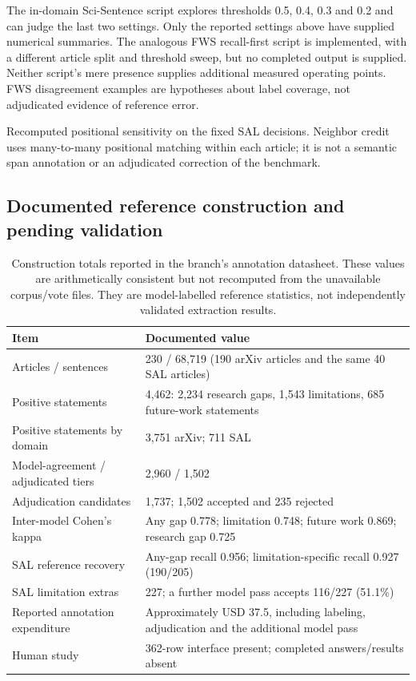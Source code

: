 The in-domain Sci-Sentence script explores thresholds 0.5, 0.4, 0.3 and 0.2 and can judge the
last two settings. Only the reported settings above have supplied numerical summaries.
The analogous FWS recall-first script is implemented, with a different article split and
threshold sweep, but no completed output is supplied. Neither script's mere presence supplies
additional measured operating points. FWS disagreement examples are hypotheses about label
coverage, not adjudicated evidence of reference error.

\begin{table}[H]
\centering\small
\caption{Recomputed positional sensitivity on the fixed SAL decisions. Neighbor credit uses
many-to-many positional matching within each article; it is not a semantic span annotation or
an adjudicated correction of the benchmark.}
\label{T:neighbor}

\end{table}

\subsection{Documented reference construction and pending validation}
\label{A:reference}

\begin{table}[H]
\centering\small
\caption{Construction totals reported in the branch's annotation datasheet. These values are
arithmetically consistent but not recomputed from the unavailable corpus/vote files. They are
model-labelled reference statistics, not independently validated extraction results.}
\label{T:reference-construction}
\begin{tabularx}{\linewidth}{@{}p{4.3cm}Y@{}}
\toprule
Item & Documented value \\
\midrule
Articles / sentences & 230 / 68,719 (190 arXiv articles and the same 40 SAL articles) \\
Positive statements & 4,462: 2,234 research gaps, 1,543 limitations, 685 future-work statements \\
Positive statements by domain & 3,751 arXiv; 711 SAL \\
Model-agreement / adjudicated tiers & 2,960 / 1,502 \\
Adjudication candidates & 1,737; 1,502 accepted and 235 rejected \\
Inter-model Cohen's kappa & Any gap 0.778; limitation 0.748; future work 0.869; research gap 0.725 \\
SAL reference recovery & Any-gap recall 0.956; limitation-specific recall 0.927 (190/205) \\
SAL limitation extras & 227; a further model pass accepts 116/227 (51.1\%) \\
Reported annotation expenditure & Approximately USD 37.5, including labeling, adjudication and the additional model pass \\
Human study & 362-row interface present; completed answers/results absent \\
\bottomrule
\end{tabularx}
\end{table}

